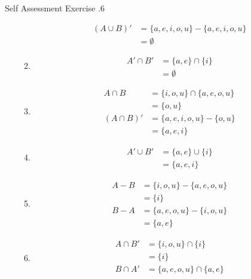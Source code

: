 \documentclass[../notes.tex]{subfiles}
\begin{document}
\begin{exercise}{Self Assessment Exercise \thechapter.6}
\begin{enumerate}
\begin{enumerate}[label=(\alph*)]
\begin{align*}
                  (A \cup B)' &= \{a, e, i, o, u\} - \{a, e, i, o, u\}\\
                  &= \emptyset
                \end{align*}
              \item \rule{0pt}{11pt} \vspace*{-25pt}
                \begin{align*}
                  A' \cap B' &= \{a, e\} \cap \{i\}\\
                  &= \emptyset
                \end{align*}
              \item \rule{0pt}{11pt} \vspace*{-25pt}
                \begin{align*}
                  A \cap B &= \{i, o, u\} \cap \{a, e, o, u\}\\
                  &= \{o, u\}\\
                  (A \cap B)' &= \{a, e, i, o, u\} - \{o, u\}\\
                  &= \{a, e, i\}
                \end{align*}
              \item \rule{0pt}{11pt} \vspace*{-25pt}
                \begin{align*}
                  A' \cup B' &= \{a, e\} \cup \{i\}\\
                  &= \{a, e, i\}
                \end{align*}
              \item \rule{0pt}{11pt} \vspace*{-25pt}
                \begin{align*}
                  A - B &= \{i, o, u\} - \{a, e, o, u\}\\
                  &= \{i\}\\
                  B - A &= \{a, e, o, u\} - \{i, o, u\}\\
                  &= \{a,e\}
                \end{align*}
              \item \rule{0pt}{11pt} \vspace*{-25pt}
                \begin{align*}
                  A \cap B' &= \{i, o, u\} \cap \{i\}\\
                  &= \{i\}\\
                  B \cap A' &= \{a, e, o, u\} \cap \{a, e\}\\

\end{align*}
\end{enumerate}
\end{enumerate}
\end{exercise}
\end{document}
